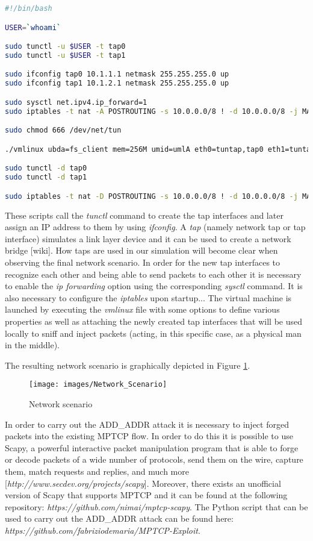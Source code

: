 \begin{lstlisting}[language=bash, caption=\textit{client.sh}, label=clientconf]
#!/bin/bash

USER=`whoami`

sudo tunctl -u $USER -t tap0
sudo tunctl -u $USER -t tap1

sudo ifconfig tap0 10.1.1.1 netmask 255.255.255.0 up
sudo ifconfig tap1 10.1.2.1 netmask 255.255.255.0 up

sudo sysctl net.ipv4.ip_forward=1
sudo iptables -t nat -A POSTROUTING -s 10.0.0.0/8 ! -d 10.0.0.0/8 -j MASQUERADE

sudo chmod 666 /dev/net/tun

./vmlinux ubda=fs_client mem=256M umid=umlA eth0=tuntap,tap0 eth1=tuntap,tap1

sudo tunctl -d tap0
sudo tunctl -d tap1

sudo iptables -t nat -D POSTROUTING -s 10.0.0.0/8 ! -d 10.0.0.0/8 -j MASQUERADE
\end{lstlisting}

These scripts call the \textit{tunctl} command to create the tap interfaces and later assign an IP address to them by using \textit{ifconfig}. A \textit{tap} (namely network tap or tap interface) simulates a link layer device and it can be used to create a network bridge [wiki]. How taps are used in our simulation will become clear when observing the final network scenario.
In order for the new tap interfaces to recognize each other and being able to send packets to each other it is necessary to enable the \textit{ip forwarding} option using the corresponding \textit{sysctl} command. It is also necessary to configure the \textit{iptables} upon startup... The virtual machine is launched by executing the \textit{vmlinux} file with some options to define various properties as well as attaching the newly created tap interfaces that will be used locally to sniff and inject packets (acting, in this specific case, as a physical man in the middle).

The resulting network scenario is graphically depicted in Figure \ref{fig:networkscenario}.

\begin{figure}[!htb]
\centering
\texttt{[image: images/Network\_Scenario]}
\caption{Network scenario}
\label{fig:networkscenario}
\end{figure}

\vspace{5mm} %
In order to carry out the ADD\_ADDR attack it is necessary to inject forged packets into the existing MPTCP flow. In order to do this it is possible to use Scapy, a powerful interactive packet manipulation program that is able to forge or decode packets of a wide number of protocols, send them on the wire, capture them, match requests and replies, and much more [\textit{http://www.secdev.org/projects/scapy}]. Moreover, there exists an unofficial version of Scapy that supports MPTCP and it can be found at the following repository: \textit{https://github.com/nimai/mptcp-scapy}. The Python script that can be used to carry out the ADD\_ADDR attack can be found here: \textit{https://github.com/fabriziodemaria/MPTCP-Exploit}. 


